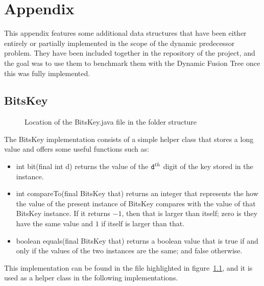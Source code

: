 
\chapter{Appendix} \label{sec:appendix}

This appendix features some additional data structures that have been either entirely or partially implemented in the scope of the dynamic predecessor problem. They have been included together in the repository of the project, and the goal was to use them to benchmark them with the Dynamic Fusion Tree once this was fully implemented.

\section{{\ttfamily BitsKey}}

\begin{figure}[H]
\caption{Location of the {\ttfamily BitsKey.java} file in the folder structure}
\label{fig:BitsKeyTree}
\end{figure}

The {\ttfamily BitsKey} implementation consists of a simple helper class that stores a {\ttfamily long} value and offers some useful functions such as:
\begin{itemize}
    \item
    {\ttfamily int bit(final int d)} returns the value of the $\text{{\ttfamily d}}^{th}$ digit of the key stored in the instance.
    
    \item
    {\ttfamily int compareTo(final BitsKey that)} returns an integer that represents the how the value of the present instance of {\ttfamily BitsKey} compares with the value of {\ttfamily that BitsKey} instance. If it returns $-1$, then {\ttfamily that} is larger than itself; zero is they have the same value and $1$ if itself is larger than {\ttfamily that}.
    
    \item
    {\ttfamily boolean equals(final BitsKey that)} returns a {\ttfamily boolean} value that is {\ttfamily true} if and only if the values of the two instances are the same; and {\ttfamily false} otherwise.
\end{itemize}

This implementation can be found in the file highlighted in figure~\ref{fig:BitsKeyTree}, and it is used as a helper class in the following implementations.

